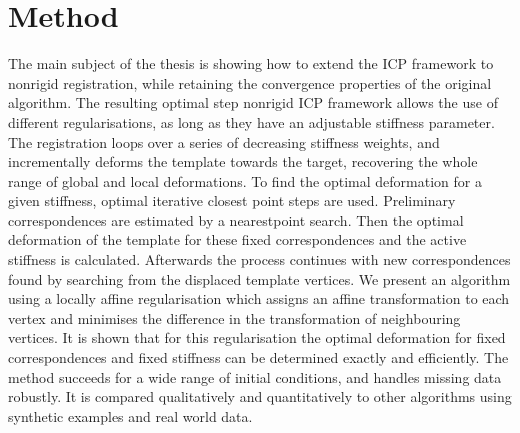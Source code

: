\documentclass[../structure.tex]{subfiles}
\begin{document}
\chapter{Method}
The main subject of the thesis is showing how to extend the ICP framework to nonrigid registration, while retaining the convergence properties of the original algorithm. The resulting optimal step nonrigid ICP framework allows the use of different regularisations, as long as they have an adjustable stiffness parameter. The registration loops over a series of decreasing stiffness weights, and incrementally deforms the template towards the target, recovering the whole range of global and local deformations. To find the optimal deformation for a given stiffness, optimal iterative closest point steps are used. Preliminary correspondences are estimated by a nearestpoint search. Then the optimal deformation of the template for these fixed correspondences and the active stiffness is calculated. Afterwards the process continues with new correspondences found by searching from the displaced template vertices. We present an algorithm using a locally affine regularisation which assigns an affine transformation to each vertex and minimises the difference in the transformation of neighbouring vertices. It is shown that for this regularisation the optimal deformation for fixed correspondences and fixed stiffness can be determined exactly and efficiently. The method succeeds for a wide range of initial conditions, and handles missing data robustly. It is compared qualitatively and quantitatively to other algorithms using synthetic examples and real world data.
\end{document}
